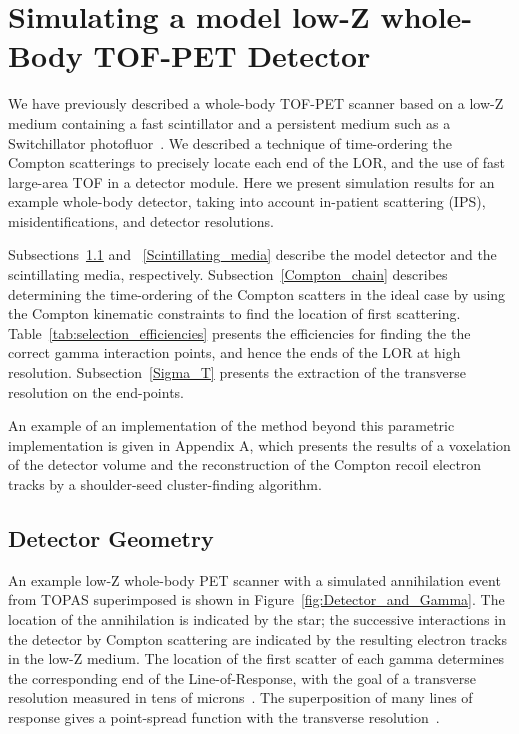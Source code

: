 \documentclass[12pt]{article}
\begin{document}
\section{Simulating a model low-Z whole-Body TOF-PET Detector}
\label{Simulation}

We have previously described a whole-body TOF-PET scanner based on a low-Z medium
containing a fast scintillator and a persistent medium such as a
Switchillator photofluor~\cite{PET_NIM_paper}. We described a technique of time-ordering the Compton scatterings to precisely locate each end of the LOR, and the use of fast large-area TOF in a detector module. Here we present simulation results for an example whole-body detector, taking into account in-patient scattering (IPS), misidentifications, and detector resolutions.

Subsections~\ref{Detector} and ~\ref{Scintillating_media} describe the model detector
and the scintillating media, respectively. Subsection~\ref{Compton_chain} describes determining
the time-ordering of the Compton scatters in the ideal case
by using the Compton kinematic constraints to find the
location of first scattering. Table~\ref{tab:selection_efficiencies}
presents the efficiencies for finding the the correct gamma interaction points, and hence the ends of the LOR at high resolution. Subsection~\ref{Sigma_T} presents the
extraction of the transverse resolution on the end-points.

An example of an implementation of the method beyond this parametric implementation is given in Appendix A, which presents the results of a voxelation of the detector volume and the reconstruction of the Compton recoil electron tracks by a shoulder-seed cluster-finding algorithm.

\subsection{Detector Geometry}
\label{Detector}

%
An example low-Z whole-body PET scanner with a simulated annihilation event from TOPAS superimposed is shown in Figure~\ref{fig:Detector_and_Gamma}. The location of the annihilation is indicated by the star; the successive interactions in the detector by Compton scattering are indicated by the resulting electron tracks in the low-Z medium. The location of the first scatter of each gamma determines the corresponding end of the Line-of-Response, with the goal of a transverse resolution measured in tens of microns~\cite{PET_NIM_paper}. The superposition of many lines of response gives a point-spread function with the transverse resolution~\cite{PET_NIM_paper}.
\end{document}
